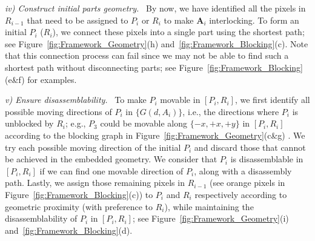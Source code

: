 

\vspace*{1.0mm}
\noindent
{\em iv) Construct initial parts geometry. } \
By now, we have identified all the pixels in $R_{i-1}$ that need to be assigned to $P_i$ or $R_i$ to make $\mathbf{A}_i$ interlocking.
To form an initial $P_i$ ($R_i$), we connect these pixels into a single part using the shortest path; see Figure~\ref{fig:Framework_Geometry}(h) and~\ref{fig:Framework_Blocking}(c).
Note that this connection process can fail since we may not be able to find such a shortest path without disconnecting parts; see Figure~\ref{fig:Framework_Blocking}(e\&f) for examples.

\vspace*{1.0mm}
\noindent
{\em v) Ensure disassemblability. } \
To make $P_i$ movable in $[P_i, R_i]$, we first identify all possible moving directions of $P_i$ in $\{G(d, A_i)\}$, i.e., the directions where $P_i$ is unblocked by $R_i$; e.g.,  $P_3$ could be movable along $\{-x, +x, +y\}$ in $[P_i, R_i]$ according to the blocking graph in Figure~\ref{fig:Framework_Geometry}(c\&g) .
We try each possible moving direction of the initial $P_i$ and discard those that cannot be achieved in the embedded geometry. 
We consider that $P_i$ is disassemblable in $[P_i, R_i]$ if we can find one movable direction of $P_i$, along with a disassembly path.
Lastly, we assign those remaining pixels in $R_{i-1}$ (see orange pixels in Figure~\ref{fig:Framework_Blocking}(c)) to $P_i$ and $R_i$ respectively according to geometric proximity (with preference to $R_i$), while maintaining the disassemblability of $P_i$ in $[P_i, R_i]$; see Figure~\ref{fig:Framework_Geometry}(i) and~\ref{fig:Framework_Blocking}(d).

